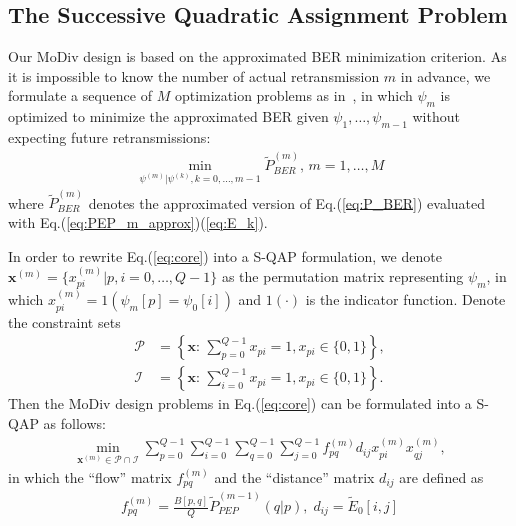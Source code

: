 \documentclass[journal]{IEEEtran}
\begin{document}
\subsection{The Successive Quadratic Assignment Problem}
\label{ssec:qap}
Our MoDiv design is based on the approximated BER minimization criterion. As it
is impossible to know the number of actual retransmission $m$ in advance, we
formulate a sequence of $M$ optimization problems as
in~\cite{harvind2005symbol}, in which $\psi_m$ is optimized to minimize the
approximated BER given $\psi_1,\ldots,\psi_{m-1}$ without expecting future
retransmissions:
\begin{align}
  \min_{\psi^{(m)}|\psi^{(k)},k=0,\ldots,m-1}\tilde{P}_{BER}^{(m)},\,m=1,\ldots,M
  \label{eq:core}
\end{align}
where $\tilde{P}_{BER}^{(m)}$ denotes the approximated version of
Eq.(\ref{eq:P_BER}) evaluated with Eq.(\ref{eq:PEP_m_approx})(\ref{eq:E_k}).

In order to rewrite Eq.(\ref{eq:core}) into a S-QAP formulation, we
denote $\mathbf{x}^{(m)} = \{x_{pi}^{(m)}|p,i=0,\ldots,Q-1\}$ as the
permutation matrix representing $\psi_m$, in which $x_{pi}^{(m)} = 1(\psi_m[p] =
\psi_0[i])$ and $1(\cdot)$ is the indicator function. Denote the constraint sets
\begin{subequations}
  \begin{align}
    \mathcal{P} & = \left\{\mathbf{x}:\,\sum_{p=0}^{Q-1}x_{pi} = 1,
    x_{pi}\in\{0, 1\}\right\}, \\
    \mathcal{I} & = \left\{\mathbf{x}:\,\sum_{i=0}^{Q-1}x_{pi} = 1,
    x_{pi}\in\{0, 1\}\right\}. 
    \label{eq:constraint}
  \end{align}
\end{subequations}
Then the MoDiv design problems in Eq.(\ref{eq:core}) can be formulated into a
S-QAP as follows:
\begin{align}
  \min_{\mathbf{x}^{(m)}\in \mathcal{P}\cap\mathcal{I}}
  \sum_{p=0}^{Q-1}\sum_{i=0}^{Q-1}
  \sum_{q=0}^{Q-1}\sum_{j=0}^{Q-1}f_{pq}^{(m)}d_{ij}x_{pi}^{(m)}x_{qj}^{(m)}, \label{eq:SQAP}
\end{align}
in which the ``flow'' matrix $f_{pq}^{(m)}$ and the ``distance'' matrix $d_{ij}$
are defined as
\begin{align}
  f_{pq}^{(m)} = \frac{B[p,q]}{Q}\tilde{P}_{PEP}^{(m-1)}(q|p),\; d_{ij} =
  \tilde{E}_0[i,j] \label{eq:fd}
\end{align}
\end{document}
